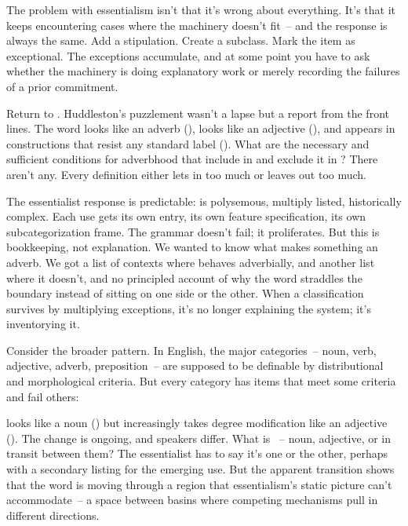 The problem with essentialism isn't that it's wrong about everything. It's that it keeps encountering cases where the machinery doesn't fit~-- and the response is always the same. Add a stipulation. Create a subclass. Mark the item as exceptional. The exceptions accumulate, and at some point you have to ask whether the machinery is doing explanatory work or merely recording the failures of a prior commitment.

Return to . Huddleston's puzzlement wasn't a lapse but a report from the front lines. The word looks like an adverb (), looks like an adjective (), and appears in constructions that resist any standard label (). What are the necessary and sufficient conditions for adverbhood that include  in  and exclude it in ? There aren't any. Every definition either lets in too much or leaves out too much.

The essentialist response is predictable:  is polysemous, multiply listed, historically complex. Each use gets its own entry, its own feature specification, its own subcategorization frame. The grammar doesn't fail; it proliferates. But this is bookkeeping, not explanation. We wanted to know what makes something an adverb. We got a list of contexts where  behaves adverbially, and another list where it doesn't, and no principled account of why the word straddles the boundary instead of sitting on one side or the other.
When a classification survives by multiplying exceptions, it's no longer explaining the system; it's inventorying it.

Consider the broader pattern. In English, the major categories~-- noun, verb, adjective, adverb, preposition~-- are supposed to be definable by distributional and morphological criteria. But every category has items that meet some criteria and fail others:

 looks like a noun () but increasingly takes degree modification like an adjective (). The change is ongoing, and speakers differ. What is ~-- noun, adjective, or in transit between them? The essentialist has to say it's one or the other, perhaps with a secondary listing for the emerging use. But the apparent transition shows that the word is moving through a region that essentialism's static picture can't accommodate~-- a space between basins where competing mechanisms pull in different directions.

